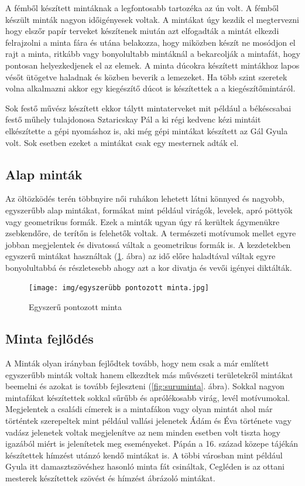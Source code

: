 \documentclass[fontsize=12pt, appendixprefix=true]{scrreprt}
\begin{document}
A fémből készített mintáknak a legfontosabb tartozéka az ún volt. A fémből készült minták nagyon időigényesek voltak. A mintákat úgy kezdik el megtervezni hogy elszőr papír terveket készítenek miután azt elfogadták a mintát elkezdi felrajzolni a minta fára és utána belakozza, hogy miközben készít ne mosódjon el rajt a minta, ritkább vagy bonyolultabb mintáknál a bekarcolják a mintafát, hogy pontosan helyezkedjenek el az elemek.
A minta dúcokra készített mintákhoz lapos vésőt ütögetve haladnak és közben beverik a lemezeket. Ha több szint szeretek volna alkalmazni akkor egy kiegészítő dúcot is készítettek a a kiegészítőmintáról.

Sok festő művész készített ekkor tálytt mintaterveket mit például a békéscsabai festő műhely tulajdonosa Sztaricskay Pál a ki régi kedvenc kézi mintáit elkészítette a gépi nyomáshoz is, aki még  gépi mintákat készített az Gál Gyula volt. Sok esetben ezeket a mintákat csak egy mesternek adták el.

\subsection{Alap minták}
Az öltözködés terén többnyire női ruhákon lehetett látni könnyed és nagyobb, egyszerűbb alap mintákat, formákat mint például virágók, levelek, apró pöttyök vagy geometrikus formák.
Ezek a minták ugyan úgy rá kerültek ágymenükre zsebkendőre, de terítőn is felehetők voltak.
A természeti motívumok mellet egyre jobban megjelentek és divatossá váltak a geometrikus formák is.
A kezdetekben egyszerű mintákat használtak (\ref{fig:egyszeruminta}. ábra) az idő előre haladtával váltak egyre bonyolultabbá és részletesebb ahogy azt a kor divatja és vevői igényei diktálták.

\begin{figure}[h!]
	\centering
	\texttt{[image: img/egyszerübb pontozott minta.jpg]}
	\caption{Egyszerű pontozott minta}
	\label{fig:egyszeruminta}
\end{figure}

\subsection{Minta fejlődés}
A Minták olyan irányban fejlődtek tovább, hogy nem csak a már említett egyszerűbb minták voltak hanem  elkezdtek más művészeti területekről mintákat beemelni és azokat is tovább fejleszteni (\ref{fig:suruminta}. ábra).
Sokkal nagyon mintafákat készítettek sokkal sűrűbb és aprólékosabb virág, levél motívumokal. Megjelentek a családi címerek is a mintafákon vagy olyan mintát ahol már történtek szerepeltek mint például vallási jelenetek Ádám és Éva története vagy vadász jelenetek voltak megjelenítve az nem minden esetben volt tiszta hogy igazából miért is jelenítetek meg eseményeket. Pápán a 16. század közepe tájékán  készítettek hímzést utánzó kendő mintákat is. A többi városban mint például Gyula itt damasztszövéshez hasonló minta fát csináltak, Cegléden is az ottani mesterek készítettek szövést és hímzést ábrázoló mintákat.
\end{document}
